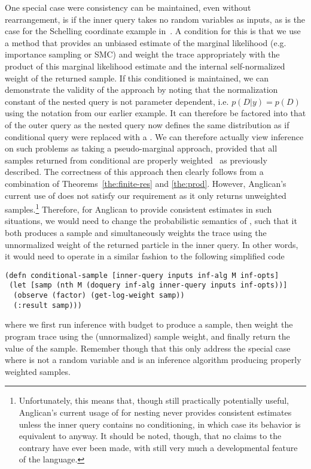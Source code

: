 One special case were consistency can be maintained, even without rearrangement,
 is if the inner query takes no 
random variables as inputs, as is the case for
the Schelling coordinate example in~\cite[Figure 6]{stuhlmuller2014reasoning}.  
A condition for this is that we use a method that provides an unbiased estimate of 
the marginal likelihood (e.g. importance sampling or SMC) and weight the trace appropriately
with the product of this marginal likelihood estimate and the internal self-normalized weight
of the returned sample.  
If this conditioned is maintained, we can demonstrate the validity of the approach by noting that
the normalization constant of the nested query is not parameter dependent, i.e. $p(D|y)=p(D)$ 
using the notation from our earlier example.  It can therefore 
be factored into that of the outer query as the nested query now defines the same distribution 
as if conditional query were replaced with a .  We can therefore actually view inference 
on such problems as taking a pseudo-marginal approach, provided that all samples returned from
conditional are properly weighted~\cite{naessethLS2015nested} as previously described.
The correctness of this approach then clearly follows from a combination of
Theorems~\ref{the:finite-res} and \ref{the:prod}.
However, Anglican's current use of \conditional does not
satisfy our requirement as it only returns unweighted samples.\footnote{Unfortunately, this
	means that, though still practically potentially useful, Anglican's current usage of 
	for nesting never provides consistent estimates unless the inner query contains no conditioning, 
	in which
	case its behavior is equivalent to  anyway.  It should be noted, though, that no claims 
	to the contrary have ever been made, with  still very much a developmental feature
	of the language.}
Therefore, for Anglican to provide consistent estimates in such situations, we would need to
change the probabilistic semantics of \conditional, such that it
both produces a sample and simultaneously weights the trace using the unnormalized weight of the returned particle in the inner query.  In other words, it would need to operate in a similar fashion
to the following simplified code
\begin{lstlisting}[basicstyle=\ttfamily\footnotesize,frame=none]
(defn conditional-sample [inner-query inputs inf-alg M inf-opts]
 (let [samp (nth M (doquery inf-alg inner-query inputs inf-opts))]
  (observe (factor) (get-log-weight samp))
  (:result samp)))
\end{lstlisting}
\vspace{-10pt}
where we first run inference with budget  to produce a sample, then weight the program trace
using the (unnormalized) sample weight, and finally return the value of the sample.
Remember though that this only address the special case where  is not a random variable
and  is an inference algorithm producing properly weighted samples.

